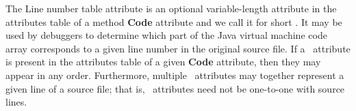 The Line number table attribute is an optional variable-length attribute in the attributes table of a method \textbf{Code} attribute and we call it 
for short \lineNumberTable.  
It may be used by debuggers to determine which part of the Java virtual machine code array corresponds to a given line number in the original source file.
 If a \lineNumberTable \ attribute is present in the attributes table of a given \textbf{Code} attribute, then they may appear in any order.
 Furthermore, multiple \lineNumberTable \ attributes may together represent a given line of a source file;
 that is, \lineNumberTable \  attributes need not be one-to-one with source lines.


